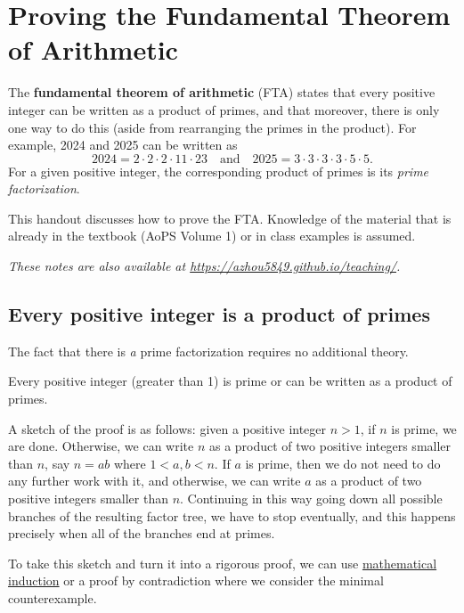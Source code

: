 \section{Proving the Fundamental Theorem of Arithmetic}

The \textbf{fundamental theorem of arithmetic} (FTA) states that every positive integer can be written as a product of primes, and that moreover, there is only one way to do this (aside from rearranging the primes in the product). For example, 2024 and 2025 can be written as
\begin{equation*}
2024 = 2\cdot 2\cdot 2\cdot 11\cdot 23\quad\text{and}\quad 2025 = 3\cdot 3\cdot 3\cdot 3\cdot 5\cdot 5.
\end{equation*}
For a given positive integer, the corresponding product of primes is its \emph{prime factorization}.

This handout discusses how to prove the FTA. Knowledge of the material that is already in the textbook (AoPS Volume 1) or in class examples is assumed.

\textit{These notes are also available at \url{https://azhou5849.github.io/teaching/}.}


\subsection{Every positive integer is a product of primes}

The fact that there is \textit{a} prime factorization requires no additional theory.

\begin{theorem}
Every positive integer (greater than 1) is prime or can be written as a product of primes.
\end{theorem}
A sketch of the proof is as follows: given a positive integer $n > 1$, if $n$ is prime, we are done. Otherwise, we can write $n$ as a product of two positive integers smaller than $n$, say $n = ab$ where $1 < a,b < n$. If $a$ is prime, then we do not need to do any further work with it, and otherwise, we can write $a$ as a product of two positive integers smaller than $n$. Continuing in this way going down all possible branches of the resulting factor tree, we have to stop eventually, and this happens precisely when all of the branches end at primes.

\begin{remark}
To take this sketch and turn it into a rigorous proof, we can use \href{https://en.wikipedia.org/wiki/Mathematical_induction}{mathematical induction} or a proof by contradiction where we consider the minimal counterexample.
\end{remark}

